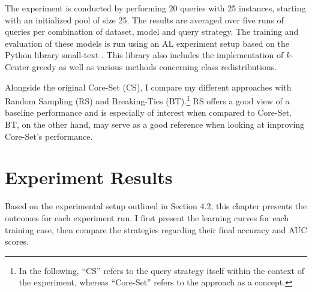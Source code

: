 \documentclass[english,bachelor,ul]{webisthesis} %
\begin{document}
The experiment is conducted by performing 20 queries with 25 instances, starting with an initialized pool of size 25. The results are averaged over five runs of queries per combination of dataset, model and query strategy. The training and evaluation of these models is run using an AL experiment setup based on the Python library small-text \citep{schroeder2023small-text}. This library also includes the implementation of $k$-Center greedy as well as various methods concerning class redistributions.

Alongside the original Core-Set (CS), I compare my different approaches with Random Sampling (RS) and Breaking-Ties (BT).\footnote{In the following, ``CS'' refers to the query strategy itself within the context of the experiment, whereas ``Core-Set'' refers to the approach as a concept.} RS offers a good view of a baseline performance and is especially of interest when compared to Core-Set. BT, on the other hand, may serve as a good reference when looking at improving Core-Set's performance.

\section{Experiment Results}

Based on the experimental setup outlined in Section 4.2, this chapter presents the outcomes for each experiment run. I first present the learning curves for each training case, then compare the strategies regarding their final accuracy and AUC scores.
\end{document}
